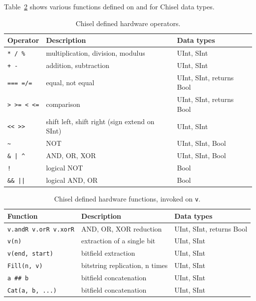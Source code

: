 \documentclass[%
    10pt,
    headinclude, footexclude,
    openright, %
    notitlepage,
    cleardoubleempty,
    headsepline,
    pointlessnumbers,
    bibtotoc, idxtotoc,
    ]{scrbook}
\newcommand{\code}[1]{{\small{\texttt{#1}}}}
\begin{document}
Table~\ref{tab:functions} shows various functions defined on and for Chisel data types.

\begin{table}
 \centering
  \begin{tabular}{lll}
    \toprule
    Operator & Description & Data types \\
    \midrule
    \code{* / \%} & multiplication, division, modulus & UInt, SInt \\
    \code{+ -} & addition, subtraction & UInt, SInt \\
    \code{=== =/=} & equal, not equal & UInt, SInt, returns Bool \\
    \code{> >= < <=} & comparison & UInt, SInt, returns Bool \\
    \code{<< >>} & shift left, shift right (sign extend on SInt) & UInt, SInt \\
    \code{\~} & NOT & UInt, SInt, Bool \\
    \code{\& | \^} & AND, OR, XOR & UInt, SInt, Bool \\
    \code{!} & logical NOT & Bool \\
    \code{\&\& ||} & logical AND, OR & Bool \\
    \bottomrule
  \end{tabular}
  \caption{Chisel defined hardware operators.}
 \label{tab:operators}
\end{table}


\begin{table}
 \centering
  \begin{tabular}{lll}
    \toprule
    Function & Description & Data types \\
    \midrule
    \code{v.andR v.orR v.xorR} & AND, OR, XOR reduction & UInt, SInt, returns Bool \\
    \code{v(n)} & extraction of a single bit & UInt, SInt \\
    \code{v(end, start)} & bitfield extraction & UInt, SInt \\
    \code{Fill(n, v)} & bitstring replication, n times & UInt, SInt \\
    \code{a \#\# b} & bitfield concatenation & UInt, SInt \\
    \code{Cat(a, b, ...)} & bitfield concatenation & UInt, SInt \\
    \bottomrule
  \end{tabular}
  \caption{Chisel defined hardware functions, invoked on \code{v}.}
   \label{tab:functions}
\end{table}
\end{document}
